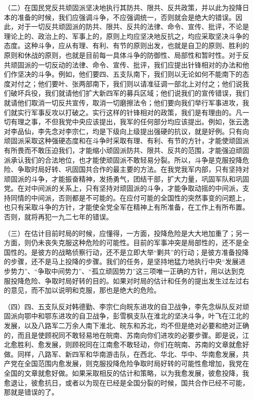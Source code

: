 （二）在国民党反共顽固派坚决地执行其防共、限共、反共政策，并以此为投降日本的准备的时候，我们应强调斗争，不应强调统一，否则就会是绝大的错误。因此，对于一切反共顽固派的防共、限共、反共的法律、命令、宣传、批评，不论是理论上的、政治上的、军事上的，原则上均应坚决地反抗之，均应采取坚决斗争的态度。这种斗争，应从有理、有利、有节的原则出发，也就是自卫的原则、胜利的原则和休战的原则，也就是目前每一具体斗争的防御性、局部性和暂时性。对于反共顽固派的一切反动的法律、命令、宣传、批评，我们应提出针锋相对的办法和他们作坚决的斗争。例如，他们要四、五支队南下，我们则以无论如何不能南下的态度对付之；他们要叶、张两部南下，我们则以请准征调一部北上对付之；他们说我们破坏兵役，我们就请他们扩大新四军的募兵区域；他们说我们的宣传错误，我们就请他们取消一切反共宣传，取消一切磨擦法令；他们要向我们举行军事进攻，我们就实行军事反攻以打破之。实行这样的针锋相对的政策，我们是有理由的。凡一切有理之事，不但我党中央应该提出，我军的任何部分均应该提出。例如，张云逸对李品仙，李先念对李宗仁，均是下级向上级提出强硬的抗议，就是好例。只有向顽固派采取这种强硬态度和在斗争时采取有理、有利、有节的方针，才能使顽固派有所畏而不敢压迫我们，才能缩小顽固派防共、限共、反共的范围，才能强迫顽固派承认我们的合法地位，也才能使顽固派不敢轻易分裂。所以，斗争是克服投降危险、争取时局好转、巩固国共合作的最主要的方法。在我党我军内部，只有坚持对顽固派的斗争，才能振奋精神，发扬勇气，团结干部，扩大力量，巩固军队和巩固党。在对中间派的关系上，只有坚持对顽固派的斗争，才能争取动摇的中间派，支持同情的中间派，否则都是不可能的。在应付可能的全国性的突然事变的问题上，也只有采取斗争的方针，才能使全党全军在精神上有所准备，在工作上有所布置。否则，就将再犯一九二七年的错误。

（三）在估计目前时局的时候，应懂得，一方面，投降危险是大大地加重了；另一方面，则仍未丧失克服这种危险的可能性。目前的军事冲突是局部性的，还不是全国性的。是彼方的战略侦察行动，还不是立即大举“剿共”的行动；是彼方准备投降的步骤，还不是马上投降的步骤。我们的任务，是坚持地猛力地执行中央“发展进步势力”、“争取中间势力”、“孤立顽固势力”这三项唯一正确的方针，用以达到克服投降危险、争取时局好转的目的。如果对时局的估计和任务的提出发生过左过右的意见，而不加以说明和克服，那也是绝大的危险。

（四）四、五支队反对韩德勤、李宗仁向皖东进攻的自卫战争，李先念纵队反对顽固派向鄂中和鄂东进攻的自卫战争，彭雪枫支队在淮北的坚决斗争，叶飞在江北的发展，以及八路军二万余人南下淮北、皖东和苏北，均不但是绝对必要和绝对正确的，而且是使顾祝同不敢轻易地在皖南、苏南向你们进攻的必要步骤。即是说，江北愈胜利、愈发展，则顾祝同在江南愈不敢轻动，你们在皖南、苏南的文章就愈好做。同样，八路军、新四军和华南游击队，在西北、华北、华中、华南愈发展，共产党在全国范围内愈发展，则克服投降危险争取时局好转的可能性愈增加，我党在全国的文章就愈好做。如果采取相反的估计和策略，以为我愈发展，彼愈投降，我愈退让，彼愈抗日，或者以为现在已经是全国分裂的时候，国共合作已经不可能，那就是错误的了。

